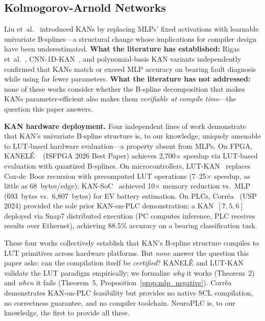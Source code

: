 \documentclass[journal,onecolumn]{IEEEtran}
\newcommand{\neuroplc}{NeuroPLC\xspace}
\begin{document}
\subsection{Kolmogorov-Arnold Networks}

Liu et~al.~\cite{liu2024kan} introduced KANs by replacing MLPs' fixed
activations with learnable univariate B-splines---a structural change whose
implications for compiler design have been underestimated.
\textbf{What the literature has established:} Rigas et~al.~\cite{rigas2025explainable},
CNN-1D-KAN~\cite{cnn1dkan2025}, and polynomial-basis KAN variants
independently confirmed that KANs match or exceed MLP accuracy on bearing
fault diagnosis while using far fewer parameters. \textbf{What the literature
has not addressed:} none of these works consider whether the B-spline
decomposition that makes KANs parameter-efficient also makes them
\textit{verifiable at compile time}---the question this paper answers.

\textbf{KAN hardware deployment.} Four independent lines of work demonstrate
that KAN's univariate B-spline structure is, to our knowledge, uniquely amenable to LUT-based
hardware evaluation---a property absent from MLPs. On FPGA, KANEL\'{E}%
~\cite{kanele2026} (ISFPGA 2026 Best Paper) achieves 2,700$\times$ speedup
via LUT-based evaluation with quantized B-splines. On microcontrollers,
LUT-KAN~\cite{lutkan2024} replaces Cox-de~Boor recursion with precomputed
LUT operations (7--25$\times$ speedup, as little as 68~bytes/edge);
KAN-SoC~\cite{flores2025kan} achieved 10$\times$ memory reduction vs.\ MLP
(693~bytes vs.\ 6{,}807~bytes) for EV battery estimation. On PLCs,
Corr\^ea~\cite{correa2024kanplc} (USP 2024) provided the sole prior
KAN-on-PLC demonstration: a KAN~$[7,5,6]$ deployed via Snap7 distributed
execution (PC computes inference, PLC receives results over Ethernet),
achieving 88.5\% accuracy on a bearing classification task.

These four works collectively establish that KAN's B-spline structure compiles
to LUT primitives across hardware platforms. But \textit{none} answer the
question this paper asks: can the compilation itself be \textit{certified}?
KANEL\'{E} and LUT-KAN validate the LUT paradigm empirically; we formalize
\textit{why} it works (Theorem~2) and \textit{when} it fails (Theorem~5,
Proposition~\ref{prop:mlp_negative}). Corr\^ea demonstrates KAN-on-PLC feasibility but provides no
native SCL compilation, no correctness guarantee, and no compiler toolchain.
\neuroplc is, to our knowledge, the first to provide all three.
\end{document}
